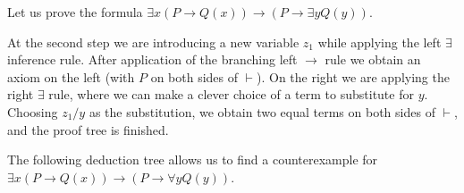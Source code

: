 \begin{page}
\setcounter{section}{2}
\setcounter{subsection}{2}
\setcounter{dfn}{7}
\label{portion:557}

\begin{exl}
Let us prove the formula $\exists x(P \to Q(x)) \to (P \to \exists y Q(y))$.
\begin{prooftree}
\end{prooftree}

At the second step we are introducing a new variable $z_1$ while applying the left $\exists$ inference rule.
After application of the branching left $\to$ rule we obtain an axiom on the left (with $P$ on both sides of $\vdash$).
On the right we are applying the right $\exists$ rule, where we can make a clever choice of a term to substitute for $y$.
Choosing $z_1/y$ as the substitution, we obtain two equal terms on both sides of $\vdash$, and the proof tree is finished.
\end{exl}

\end{page}

\begin{page}
\setcounter{section}{2}
\setcounter{subsection}{2}
\setcounter{dfn}{8}
\label{portion:560}

\begin{exl}
\label{exl:CounterexamplePred}
The following deduction tree allows us to find a counterexample for $\exists x(P \to Q(x)) \to (P \to \forall y Q(y))$.
\begin{prooftree}
\end{prooftree}
\end{exl}

\end{page}

